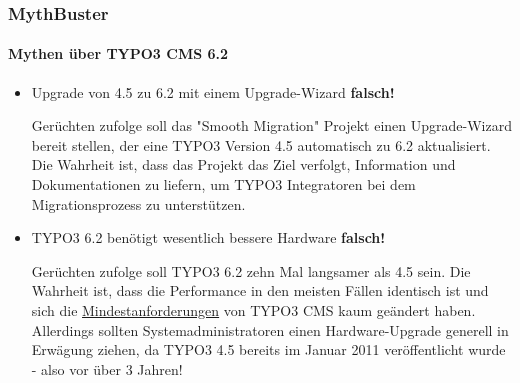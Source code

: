 \begin{frame}[fragile]
	\frametitle{MythBuster}
	\framesubtitle{Mythen über TYPO3 CMS 6.2}

	\begin{itemize}
		\item Upgrade von 4.5 zu 6.2 mit einem Upgrade-Wizard
			\tabto{9cm}\color{red}\textbf{\textrightarrow falsch!}\color{black}

			\smaller
				Gerüchten zufolge soll das "Smooth Migration" Projekt einen Upgrade-Wizard bereit stellen, der eine TYPO3 Version 4.5 automatisch zu 6.2 aktualisiert. Die Wahrheit ist, dass das Projekt das Ziel verfolgt, Information und Dokumentationen zu liefern, um TYPO3 Integratoren bei dem Migrationsprozess zu unterstützen.
			\normalsize
			\newline

		\item TYPO3 6.2 benötigt wesentlich bessere Hardware
			\tabto{9cm}\color{red}\textbf{\textrightarrow falsch!}\color{black}

			\smaller
				Gerüchten zufolge soll TYPO3 6.2 zehn Mal langsamer als 4.5 sein. Die Wahrheit ist, dass die Performance in den meisten Fällen identisch ist und sich die \href{http://typo3.org/about/typo3-the-cms/system-requirements/}{Mindestanforderungen} von TYPO3 CMS kaum geändert haben. Allerdings sollten Systemadministratoren einen Hardware-Upgrade generell in Erwägung ziehen, da TYPO3 4.5 bereits im Januar 2011 veröffentlicht wurde - also vor über 3 Jahren!
			\normalsize

	\end{itemize}

\end{frame}


